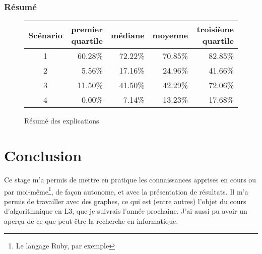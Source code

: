 \documentclass[]{article}
\begin{document}
\subsubsection{Résumé}

\begin{figure}[h]
\begin{center}
\begin{tabular}{|c|r|r|r|r|}
\hline
Scénario&premier quartile&médiane&moyenne&troisième quartile\\
\hline
1&60.28\%&72.22\%&70.85\%&82.85\%\\
\hline
2&5.56\%&17.16\%&24.96\%&41.66\%\\
\hline
3&11.50\%&41.50\%&42.29\%&72.06\%\\
\hline
4&0.00\%&7.14\%&13.23\%&17.68\%\\
\hline
\end{tabular}
\end{center}
\caption{Résumé des explications}
\end{figure}
\section{Conclusion}

Ce stage m'a permis de mettre en pratique les connaissances apprises en cours
ou par moi-même\footnote{Le langage Ruby, par exemple}, de façon autonome,
et avec la présentation de résultats. Il m'a permis de travailler avec des
graphes, ce qui est (entre autres) l'objet du cours d'algorithmique en L3,
que je suivrais l'année prochaine. J'ai aussi pu avoir un aperçu de ce que
peut être la recherche en informatique.
\end{document}

